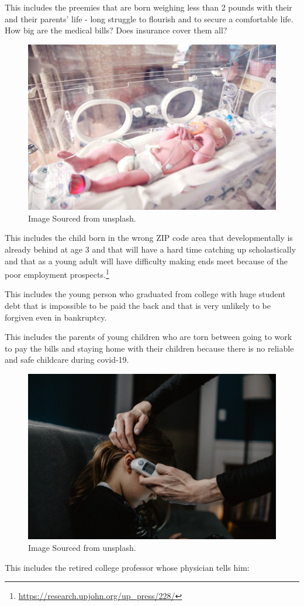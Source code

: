 \documentclass[
]{book}
\begin{document}
This includes the preemies that are born weighing less than 2 pounds with their and their parents' life - long struggle to flourish and to secure a comfortable life. How big are the medical bills? Does insurance cover them all?

\begin{figure}
\includegraphics[width=0.5\linewidth]{img/ch0/fig4} \caption{Image Sourced from unsplash.}\label{fig:fig004}
\end{figure}

This includes the child born in the wrong ZIP code area that developmentally is already behind at age 3 and that will have a hard time catching up scholastically and that as a young adult will have difficulty making ends meet because of the poor employment prospects.\footnote{\url{https://research.upjohn.org/up_press/228/}}

This includes the young person who graduated from college with huge student debt that is impossible to be paid the back and that is very unlikely to be forgiven even in bankruptcy.

This includes the parents of young children who are torn between going to work to pay the bills and staying home with their children because there is no reliable and safe childcare during covid-19.

\begin{figure}
\includegraphics[width=0.5\linewidth]{img/ch0/fig5} \caption{Image Sourced from unsplash.}\label{fig:fig005}
\end{figure}

This includes the retired college professor whose physician tells him:
\end{document}
